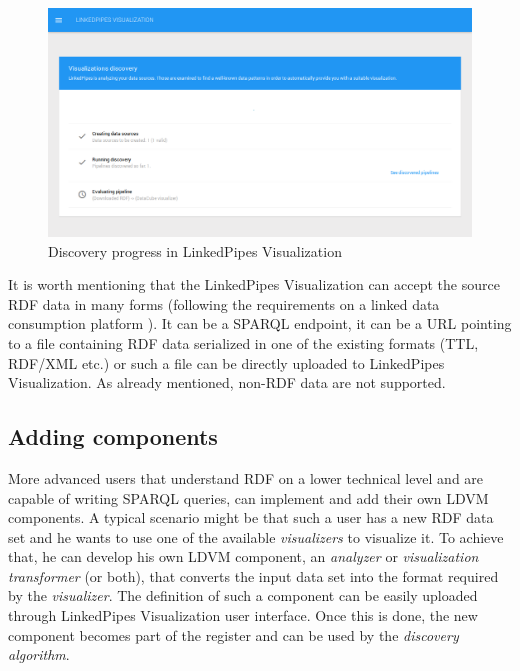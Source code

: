 \begin{figure}
	\centering
	\includegraphics[width=130mm]{img/03_linked_pipes_discovery.png}
	\caption{Discovery progress in LinkedPipes Visualization} 
	\label{fig:linked-pipes-discovery}
\end{figure}

It is worth mentioning that the LinkedPipes Visualization can accept the source RDF data in many forms (following the requirements on a linked data consumption platform \cite{requirements_on_ldcp}). It can be a SPARQL endpoint, it can be a URL pointing to a file containing RDF data serialized in one of the existing formats (TTL, RDF/XML etc.) or such a file can be directly uploaded to LinkedPipes Visualization. As already mentioned, non-RDF data are not supported.

\subsection{Adding components}

More advanced users that understand RDF on a lower technical level and are capable of writing SPARQL queries, can implement and add their own LDVM components. A typical scenario might be that such a user has a new RDF data set and he wants to use one of the available \emph{visualizers} to visualize it. To achieve that, he can develop his own LDVM component, an \emph{analyzer} or \emph{visualization transformer} (or both), that converts the input data set into the format required by the \emph{visualizer}. The definition of such a component can be easily uploaded through LinkedPipes Visualization user interface. Once this is done, the new component becomes part of the register and can be used by the \emph{discovery algorithm}.

